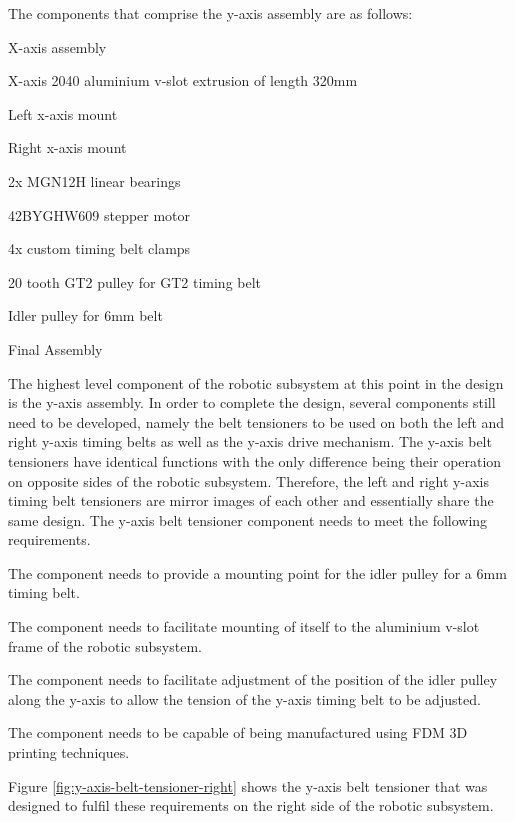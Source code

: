 The components that comprise the y-axis assembly are as follows:

\begin{compactitem}
	\item X-axis assembly
	\item X-axis 2040 aluminium v-slot extrusion of length 320mm
	\item Left x-axis mount
	\item Right x-axis mount
	\item 2x MGN12H linear bearings
	\item 42BYGHW609 stepper motor
	\item 4x custom timing belt clamps
	\item 20 tooth GT2 pulley for GT2 timing belt
	\item Idler pulley for 6mm belt
\end{compactitem}

Final Assembly

The highest level component of the robotic subsystem at this point in the design is the y-axis assembly. In order to complete the design, several components still need to be developed, namely the belt tensioners to be used on both the left and right y-axis timing belts as well as the y-axis drive mechanism. The y-axis belt tensioners have identical functions with the only difference being their operation on opposite sides of the robotic subsystem. Therefore, the left and right y-axis timing belt tensioners are mirror images of each other and essentially share the same design. The y-axis belt tensioner component needs to meet the following requirements.

\begin{compactitem}
	\item The component needs to provide a mounting point for the idler pulley for a 6mm timing belt.
	\item The component needs to facilitate mounting of itself to the aluminium v-slot frame of the robotic subsystem.
	\item The component needs to facilitate adjustment of the position of the idler pulley along the y-axis to allow the tension of the y-axis timing belt to be adjusted.
	\item The component needs to be capable of being manufactured using FDM 3D printing techniques.
\end{compactitem}

Figure \ref{fig:y-axis-belt-tensioner-right} shows the y-axis belt tensioner that was designed to fulfil these requirements on the right side of the robotic subsystem.

